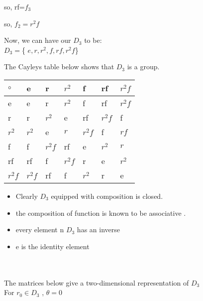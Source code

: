 \documentclass{article}
\begin{document}
\newcommand{\MidText}[1]{
\begin{tikzpicture}
    \draw [color=white](0,-3) -- (0,3);
    \draw [color=white](-0.4,0) -- (0.4,0);
    \draw[color=white](-0.4,0) -- (0.4,0);
    \node at (0,0.3) {$#1$};
\end{tikzpicture}}



so,  rf=$f_3$

so, $f_2=r^2f$

Now, we can have our $D_3$ to be:\\
 $D_3=$\{ $e,r,r^2,f,rf,r^2f$\}
 \vspace{2cm}

The Cayleys table below shows that $D_3$ is a group.\\
\begin{tabular}{| l | l | l | l |l |l |l |}
    $\circ$  & e & r& $r^2$& f &rf & $r^2f$ \\ 
    \hline
    e  & e & r& $r^2$& f &rf & $r^2f$ \\
     \hline
    r & r& $r^2$& e & rf & $r^2f$&f \\
    \hline
    $r^2$ &$r^2$ & e& $r$&$r^2f$  &f & $rf$ \\
    \hline
    f &f& $r^2f$& rf& e & $r^2$ & $r$ \\
     \hline
    rf & rf& f & $r^2f$ & r &e& $r^2$ \\
     \hline
    $r^2f$ &$r^2f$&rf &f& $r^2$ & r& e \\
    \hline
    \end{tabular}

\begin{itemize}
    \item Clearly $D_3$ equipped with composition is closed.
    \item the composition of function is known to be associative .
    \item every element n $D_3$ has an inverse 
\item e is the identity element 
\end{itemize}

\\\\
\large{The matrices below give a two-dimensional representation of $D_3$ }\\

For $r_0 \in D_3$ , $\theta = 0$\\
\end{document}
